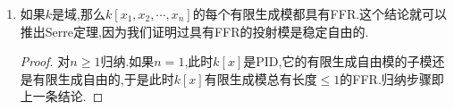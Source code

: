 \begin{enumerate}
\begin{proof}
    	假设$\mathrm{Ann}(M)\cap A\not=\{0\}$,那么任取$0\not=m\in M$,都有$\mathrm{Ann}(m)\cap A\not=\{0\}$.记$I=\mathrm{Ann}(m)\cap A$,就有$A/I\cong Am$.按照$A[x]$是平坦$A$模,得到$0\to A[x]\otimes_AI\to A[x]\to A[x]\otimes_AAm\to0$.这里$A[x]\otimes_AI\cong A[x]I$,于是$A[x]I\not=0$.现在$A[x]/A[x]I\cong A[x]\otimes_AAm$是$M$的一个循环子模,记作$\langle m_1\rangle,m_1\in M$,并且它落在$\mathscr{S}$中.于是$\mathrm{Ann}(m_1)\cong A[x]I$.于是$\mathrm{Ann}(x_1)\cap A\not=\{0\}$.继续对$A[x]$模$M/\langle m_1\rangle$操作,可取$m_2+\langle m_1\rangle\in M/\langle m_1\rangle$,使得$\mathrm{Ann}(m_2+\langle m_1\rangle)\cap A\not=\{0\}$,并且$\langle m_1,m_2\rangle/\langle m_1\rangle\in\mathscr{S}$.于是$\langle m_1,m_2\rangle\in\mathscr{S}$和$\mathrm{Ann}(m_1,m_2)\cap A\not=\{0\}$.按照$M$是有限生成的,这个操作必然会终止.于是我们证明了如果有限生成模$M$满足$\mathrm{Ann}(M)\cap A\not=\{0\}$,那么$M\in\tau(\mathscr{S})$.
    	
    	现在按照上一条结论,存在子模链$M=M_0\supset\cdots M_n=\{0\}$,使得每个$M_i/M_{i+1}\cong A[x]/p_i$,其中$p_i$是$A[x]$的素理想.一旦我们证明了每个整环$A[x]/p$都在$\tau(\sigma)$中,那么反复归纳下去得到每个$M_i\in\tau(\sigma)$,最后就得到$M\in\tau(\sigma)$.并且按照上一段的讨论,可不妨设$\mathrm{Ann}(A[x]/p)\cap A=p\cap A=\{0\}$,这等价于讲$A$和$A[x]$都是整环.现在任取$0\not=f(x)\in A[x]$,有$A[x]$模的短正合列$0\to A[x]f(x)\to p\to p/(f)\to0$.整环条件说明$A[x]f(x)\cong A[x]$,而$\mathrm{Ann}(p/(f(x)))\not=\{0\}$,于是$p\in\tau(\sigma)$,于是又导致$A[x]/p\in\tau(\sigma)$,完成证明.
    \end{proof}
    \item 如果$k$是域,那么$k[x_1,x_2,\cdots,x_n]$的每个有限生成模都具有FFR.这个结论就可以推出Serre定理,因为我们证明过具有FFR的投射模是稳定自由的.
    \begin{proof}
    	
    	对$n\ge1$归纳.如果$n=1$,此时$k[x]$是PID,它的有限生成自由模的子模还是有限生成自由的,于是此时$k[x]$有限生成模总有长度$\le1$的FFR.归纳步骤即上一条结论.
    \end{proof}
\end{enumerate}

